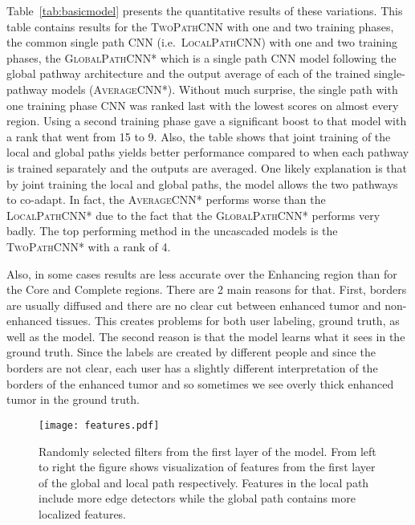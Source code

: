 \documentclass[final,5p,times,twocolumn]{elsarticle}
\begin{document}
Table~\ref{tab:basicmodel} presents the quantitative results of these variations. This table contains results for the \textsc{TwoPathCNN} with one and two training phases, the common single path CNN (i.e.\  \textsc{LocalPathCNN}) with one and two training phases, the \textsc{GlobalPathCNN*} which is a single path CNN model following the global pathway architecture and the output average of each of the trained single-pathway models (\textsc{AverageCNN*}). Without much surprise, the single path with one training phase CNN was ranked last with the lowest scores on almost every region.  Using a second training phase gave a significant boost to that model with a rank that went from 15 to 9. Also, the table shows that joint training of the local and global paths yields better performance compared to when each pathway is trained separately and the outputs are averaged. One likely explanation is that by joint training the local and global paths, the model allows the two pathways to co-adapt. In fact, the \textsc{AverageCNN*} performs worse than the \textsc{LocalPathCNN*} due to the fact that the \textsc{GlobalPathCNN*} performs very badly. The top performing method in the uncascaded models is the \textsc{TwoPathCNN*} with a rank of 4.

Also, in some cases results are less accurate over the Enhancing region than for the Core and Complete regions.  There are 2 main reasons for that.  First, borders are usually diffused and there are no clear cut between enhanced tumor and non-enhanced tissues. This creates problems for both user labeling, ground truth, as well as the model. The second reason is that the model learns what it sees in the ground truth. Since the labels are created by different people and since the borders are not clear, each user has a slightly different interpretation of the borders of the enhanced tumor and so sometimes we see overly thick enhanced tumor in the ground truth.

\begin{figure}

\centering

\texttt{[image: features.pdf]}

\caption{Randomly selected filters from the first layer of the model. From left to right the figure shows visualization of features from the first layer of the global and local path respectively. Features in the local path include more edge detectors while the global path contains more localized features.}

\label{fig:features}
\end{figure}
\end{document}
